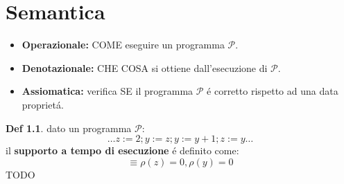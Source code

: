 \documentclass[a4paper]{report}
\newcommand{\prop}{\mathcal{P}}
\theoremstyle{definition} \newtheorem*{defi}{Def}
\theoremstyle{plain} \newtheorem{lemma}{Lemma}
\theoremstyle{plain} \newtheorem{teo}{Teorema}
\theoremstyle{remark} \newtheorem*{es}{Esempio}
\begin{document}
\chapter{Semantica}
\begin{itemize}
	\item {\bf Operazionale:} COME eseguire un programma $\prop$.
	\item {\bf Denotazionale:} CHE COSA si ottiene dall'esecuzione di $\prop$.
	\item {\bf Assiomatica:} verifica SE il programma $\prop$ \'e corretto rispetto ad una data propriet\'a.
\end{itemize}
\begin{defi} dato un programma $\prop$:
	\begin{equation}
		{\ldots}z:=2; y:=z; y:=y+1; z:=y{\ldots}
	\end{equation}
	il {\bf supporto a tempo di esecuzione} \'e definito come:
	\begin{equation}
		[z=0, y=0] \equiv \rho(z) = 0, \rho(y) = 0
	\end{equation}
	TODO
\end{defi}
\end{document}
